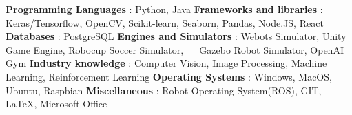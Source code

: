 \begin{cventries}  
\skillentry
    {
    \bullet \space \textbf{Programming Languages} : Python, Java \newline
    \bullet \space \textbf{Frameworks and libraries} : Keras/Tensorflow, OpenCV, Scikit-learn, Seaborn, Pandas, Node.JS, React \newline
    \bullet \space \textbf{Databases} : PostgreSQL \newline
    \bullet \space \textbf{Engines and Simulators} : Webots Simulator, Unity Game Engine, Robocup Soccer Simulator, \newline $\quad$ Gazebo Robot Simulator, OpenAI Gym \newline
    \bullet \space \textbf{Industry knowledge} : Computer Vision, Image Processing, Machine Learning, Reinforcement Learning \newline
    \bullet \space \textbf{Operating Systems} : Windows, MacOS, Ubuntu, Raspbian \newline
    \bullet \space \textbf{Miscellaneous} : Robot Operating System(ROS), GIT, LaTeX, Microsoft Office
    }
\end{cventries}
